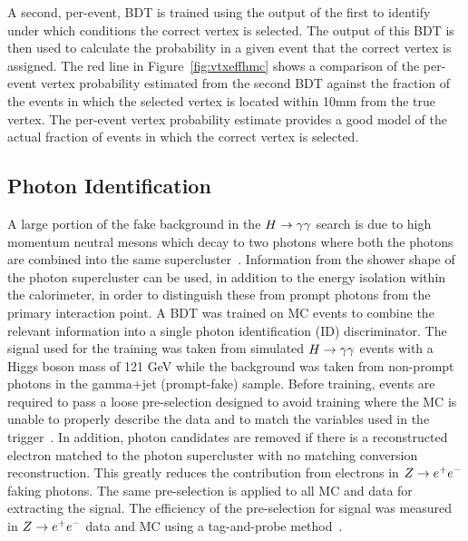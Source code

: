 A second, per-event, BDT is trained using the output of the first to identify 
under which conditions the correct vertex is selected. The output of this BDT is then used to 
calculate the probability in a given event that the correct vertex is assigned. The red line in Figure~\ref{fig:vtxeffhmc}
shows a comparison of the per-event vertex probability estimated from the second BDT against the 
fraction of the events in which the selected vertex is located within 10mm from the true vertex. The per-event vertex probability 
estimate provides a good model of the actual fraction of events in which the correct vertex is selected.

\subsection{Photon Identification}
\label{sec:photonidentification}

A large portion of the fake background in the $H\rightarrow\gamma\gamma$ search is due to high momentum neutral mesons
which decay to two photons where both the photons are combined into the same supercluster~\citep{HIG-11-033}. 
Information from the shower shape of the photon supercluster can be used, in addition to the 
energy isolation within the calorimeter, in order to distinguish these from prompt photons
from the primary interaction point. A BDT was trained on MC events to combine the relevant information
into a single photon identification (ID) discriminator. The signal used for the training was taken from 
simulated $H\rightarrow\gamma\gamma$ events with a Higgs boson mass of 121 GeV while the background was 
taken from non-prompt photons in the gamma+jet (prompt-fake) sample.
Before training, events are required to pass a loose pre-selection designed to avoid training 
where the MC is unable to properly describe the data and to match the variables used in the trigger~\citep{AN-12-048}.
In addition, photon candidates are removed if there is a reconstructed electron matched to the 
photon supercluster with no matching conversion reconstruction. This greatly reduces the contribution
from electrons in $Z\rightarrow e^{+}e^{-}$ faking photons. The same pre-selection is applied to all MC and data for extracting the signal.
The efficiency of the pre-selection for signal was measured in $Z\rightarrow e^{+}e^{-}$ data and MC using a tag-and-probe 
method~\citep{AN-12-116}. 

